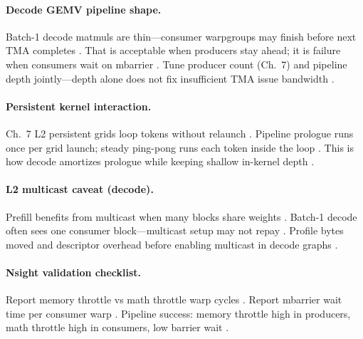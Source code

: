 \paragraph{Decode GEMV pipeline shape.}
Batch-1 decode matmuls are thin---consumer warpgroups may finish before next TMA completes \citep{patel2025llminference,shah2024flashattention3,memoryfloor2026}.
That is acceptable when producers stay ahead; it is failure when consumers wait on mbarrier \citep{semianalysis2024tma,yirage2026}.
Tune producer count (Ch.~7) and pipeline depth jointly---depth alone does not fix insufficient TMA issue bandwidth \citep{shah2024flashattention3,taxbreak2026}.

\paragraph{Persistent kernel interaction.}
Ch.~7 L2 persistent grids loop tokens without relaunch \citep{mpk2025,nvidia2024cudagraphs,shah2024flashattention3}.
Pipeline prologue runs once per grid launch; steady ping-pong runs each token inside the loop \citep{patel2025llminference,yirage2026}.
This is how decode amortizes prologue while keeping shallow in-kernel depth \citep{taxbreak2026,memoryfloor2026,dao2022flashattention}.

\paragraph{L2 multicast caveat (decode).}
Prefill benefits from multicast when many blocks share weights \citep{kwon2023vllm,shah2024flashattention3}.
Batch-1 decode often sees one consumer block---multicast setup may not repay \citep{taxbreak2026,patel2025llminference,semianalysis2024tma}.
Profile bytes moved and descriptor overhead before enabling multicast in decode graphs \citep{yirage2026,chen2020compilerbasedhardw,memoryfloor2026}.

\paragraph{Nsight validation checklist.}
Report memory throttle vs math throttle warp cycles \citep{shah2024flashattention3,patel2025llminference}.
Report mbarrier wait time per consumer warp \citep{semianalysis2024tma,nvidia2022hopper}.
Pipeline success: memory throttle high in producers, math throttle high in consumers, low barrier wait \citep{yirage2026,memoryfloor2026,taxbreak2026}.

